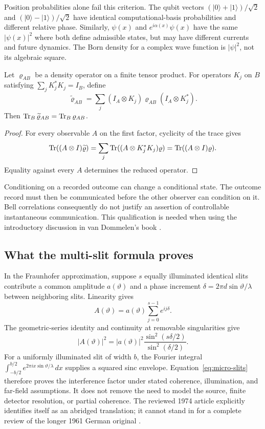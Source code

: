 Position probabilities alone fail this criterion.  The qubit vectors
$(|0\rangle+|1\rangle)/\sqrt2$ and
$(|0\rangle-|1\rangle)/\sqrt2$ have identical computational-basis
probabilities and different relative phase.  Similarly,
$\psi(x)$ and $e^{i\alpha(x)}\psi(x)$ have the same $|\psi(x)|^2$
where both define admissible states, but may have different currents and
future dynamics.  The Born density for a complex wave function is
$|\psi|^2$, not its algebraic square.

\begin{proposition}
\label{prop:micro-nosignalling}
Let $\varrho_{AB}$ be a density operator on a finite tensor product.
For operators $K_j$ on $B$ satisfying $\sum_jK_j^*K_j=I_B$, define
\[
 \widetilde\varrho_{AB}
 =\sum_j(I_A\otimes K_j)\varrho_{AB}(I_A\otimes K_j^*).
\]
Then $\operatorname{Tr}_B\widetilde\varrho_{AB}=\operatorname{Tr}_B\varrho_{AB}$.
\end{proposition}
\begin{proof}
For every observable $A$ on the first factor, cyclicity of the trace gives
\[
 \operatorname{Tr}((A\otimes I)\widetilde\varrho)
 =\sum_j\operatorname{Tr}((A\otimes K_j^*K_j)\varrho)
 =\operatorname{Tr}((A\otimes I)\varrho).
\]
Equality against every $A$ determines the reduced operator.
\end{proof}

Conditioning on a recorded outcome can change a conditional state.  The
outcome record must then be communicated before the other observer can
condition on it.  Bell correlations consequently do not justify an
assertion of controllable instantaneous communication.  This qualification
is needed when using the introductory discussion in van Dommelen's
book \citep{microVanDommelen}.

\subsection{What the multi-slit formula proves}

In the Fraunhofer approximation, suppose $s$ equally illuminated identical
slits contribute a common amplitude $a(\vartheta)$ and a phase increment
$\delta=2\pi d\sin\vartheta/\lambda$ between neighboring slits.
Linearity gives
\[
 A(\vartheta)=a(\vartheta)\sum_{j=0}^{s-1}e^{ij\delta}.
\]
The geometric-series identity and continuity at removable singularities
give
\begin{equation}
 |A(\vartheta)|^2
 =|a(\vartheta)|^2
 \frac{\sin^2(s\delta/2)}{\sin^2(\delta/2)}.
 \label{eq:micro-slits}
\end{equation}
For a uniformly illuminated slit of width $b$, the Fourier integral
$\int_{-b/2}^{b/2}e^{2\pi i x\sin\vartheta/\lambda}\,dx$
supplies a squared sinc envelope.  Equation~\eqref{eq:micro-slits}
therefore proves the interference factor under stated coherence,
illumination, and far-field assumptions.  It does not remove the need to
model the source, finite detector resolution, or partial coherence.
The reviewed 1974 article explicitly identifies itself as an abridged
translation; it cannot stand in for a complete review of the longer
1961 German original \citep{microJonsson1961,microJonsson1974}.

